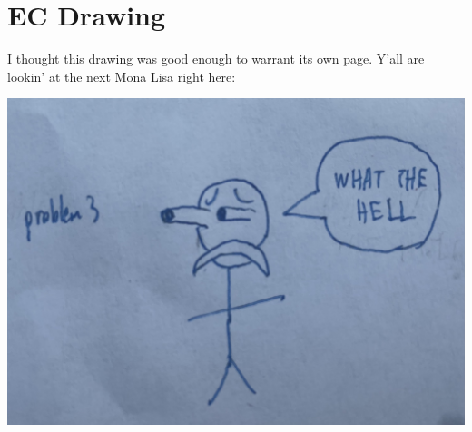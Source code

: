 \documentclass[12pt]{article}
\begin{document}
\pagebreak

\section{EC Drawing}

I thought this drawing was good enough to warrant its own page.
Y'all are lookin' at the next Mona Lisa right here:
\begin{center}
    \includegraphics[width=15cm]{ec_drawing}
\end{center}
\end{document}
